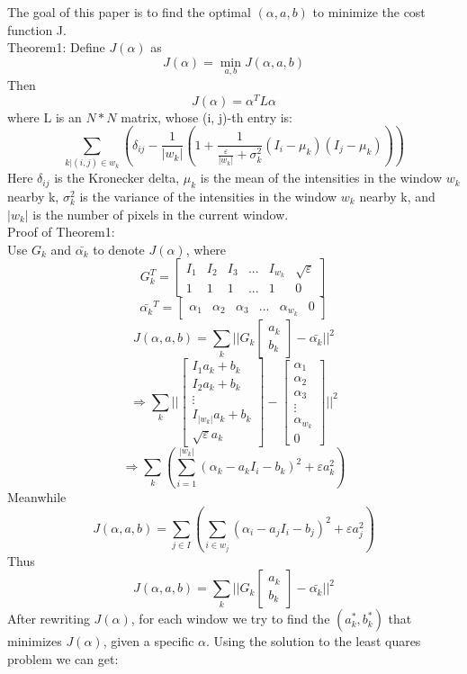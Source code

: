 \documentclass[11pt,letterpaper]{article}
\begin{document}
The goal of this paper is to find the optimal $(\alpha, a, b)$ to minimize the cost function J.\\

Theorem1: Define $J(\alpha)$ as 
$$J(\alpha) = \min_{a,b} J(\alpha, a, b)$$
Then
$$J(\alpha) = \alpha^T L \alpha$$
where L is an $N * N$ matrix, whose (i, j)-th entry is:
$$\sum_{k|(i, j) \in w_k}(\delta_{ij} - \frac{1}{|w_k|}(1+\frac{1}{\frac{\varepsilon}{|w_k|} + \sigma_k^2}(I_i - \mu_k)(I_j - \mu_k)))$$
Here $\delta_{ij}$ is the Kronecker delta, $\mu_k$ is the mean of the intensities in the window $w_k$  nearby k, $\sigma_k^2$ is the variance of the intensities in the window $w_k$  nearby k, and $|w_k|$ is the number of pixels in the current window. \\

Proof of Theorem1:\\

Use $G_k$ and $\bar{\alpha_k}$  to denote $J(\alpha)$, where
$$ G_k^T=
  \begin{bmatrix}
    I_1 & I_2 & I_3 & ... & I_{w_k} & \sqrt{\varepsilon}\\
    1 & 1 & 1 & ... & 1 & 0 
  \end{bmatrix} $$
$$ \bar{\alpha_k}^T=
  \begin{bmatrix}
    \alpha_1 & \alpha_2 & \alpha_3 & ... & \alpha_{w_k} & 0 
  \end{bmatrix} $$
$$J(\alpha, a, b) = \sum_{k}||G_k \begin{bmatrix} a_k \\ b_k\end{bmatrix} - \bar{\alpha_k}||^2$$
$$\Rightarrow \sum_k||\begin{bmatrix} I_{1} a_k + b_k \\ I_{2} a_k + b_k \\ \vdots \\ I_{|w_k|} a_k + b_k \\ \sqrt{\varepsilon} a_k \end{bmatrix} - 
\begin{bmatrix}
    \alpha_1 \\ \alpha_2 \\ \alpha_3 \\ \vdots\\ \alpha_{w_k} \\ 0 
\end{bmatrix}||^2$$
$$\Rightarrow \sum_{k}(\sum_{i = 1}^{|w_{k}|}(\alpha_k - a_kI_i-b_k)^2+\varepsilon a_k^2)$$
Meanwhile 
$$J(\alpha, a, b) = \sum_{j \in I}(\sum_{i \in w_j}(\alpha_i - a_jI_i-b_j)^2+\varepsilon a_j^2)$$
Thus
$$J(\alpha, a, b) = \sum_{k}||G_k \begin{bmatrix} a_k \\ b_k\end{bmatrix} - \bar{\alpha_k}||^2$$
After rewriting $J(\alpha)$, for each window we try to find the $(a_k^*, b_k^*)$ that minimizes $J(\alpha)$, given a specific $\alpha$. Using the solution to the least quares problem we can get:
\end{document}
